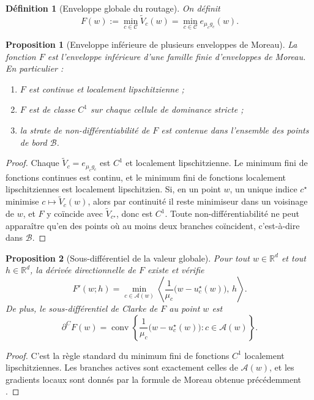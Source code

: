 \documentclass[11pt,a4paper]{article}
\newtheorem{definition}{Définition}[section]
\newtheorem{proposition}{Proposition}[section]
\newcommand{\R}{\mathbb R}
\newcommand{\Ccal}{\mathcal C}
\begin{document}
\begin{definition}[Enveloppe globale du routage]
On définit
\[
F(w):=\min_{c\in\Ccal}\widetilde V_c(w)
=
\min_{c\in\Ccal}e_{\mu_c g_c}(w).
\]
\end{definition}

\begin{proposition}[Enveloppe inférieure de plusieurs enveloppes de Moreau]
La fonction \(F\) est l'enveloppe inférieure d'une famille finie d'enveloppes de Moreau. En particulier :
\begin{enumerate}[leftmargin=2em]
\item \(F\) est continue et localement lipschitzienne ;
\item \(F\) est de classe \(C^1\) sur chaque cellule de dominance stricte ;
\item la strate de non-différentiabilité de \(F\) est contenue dans l'ensemble des points de bord \(\mathcal B\).
\end{enumerate}
\end{proposition}

\begin{proof}
Chaque \(\widetilde V_c=e_{\mu_c g_c}\) est \(C^1\) et localement lipschitzienne. Le minimum fini de fonctions continues est continu, et le minimum fini de fonctions localement lipschitziennes est localement lipschitzien. Si, en un point \(w\), un unique indice \(c^\star\) minimise \(c\mapsto \widetilde V_c(w)\), alors par continuité il reste minimiseur dans un voisinage de \(w\), et \(F\) y coïncide avec \(\widetilde V_{c^\star}\), donc est \(C^1\). Toute non-différentiabilité ne peut apparaître qu'en des points où au moins deux branches coïncident, c'est-à-dire dans \(\mathcal B\).
\end{proof}

\begin{proposition}[Sous-différentiel de la valeur globale]
Pour tout \(w\in\R^d\) et tout \(h\in\R^d\), la dérivée directionnelle de \(F\) existe et vérifie
\[
F'(w;h)=\min_{c\in\mathcal A(w)}\left\langle \frac{1}{\mu_c}\bigl(w-u_c^\star(w)\bigr),\,h\right\rangle.
\]
De plus, le sous-différentiel de Clarke de \(F\) au point \(w\) est
\[
\partial^C F(w)
=
\operatorname{conv}\left\{
\frac{1}{\mu_c}\bigl(w-u_c^\star(w)\bigr): c\in\mathcal A(w)
\right\}.
\]
\end{proposition}

\begin{proof}
C'est la règle standard du minimum fini de fonctions \(C^1\) localement lipschitziennes. Les branches actives sont exactement celles de \(\mathcal A(w)\), et les gradients locaux sont donnés par la formule de Moreau obtenue précédemment \cite{Clarke1983}.
\end{proof}
\end{document}
